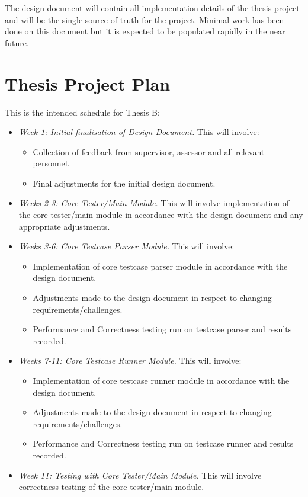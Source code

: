 \documentclass[hidelinks, 12pt]{extreport}
\begin{document}
The design document will contain all implementation details of the thesis project and will be the single source of truth for the project. Minimal work has been done on this document but it is expected to be populated rapidly in the near future.

\section{Thesis Project Plan}

This is the intended schedule for Thesis B:
\begin{itemize}
	\item \textit{Week 1: Initial finalisation of Design Document.} This will involve:
	\begin{itemize}
		\item Collection of feedback from supervisor, assessor and all relevant personnel.
		\item Final adjustments for the initial design document.
	\end{itemize}
	\item \textit{Weeks 2-3: Core Tester/Main Module.} This will involve implementation of the core tester/main module in accordance with the design document and any appropriate adjustments.
	\item \textit{Weeks 3-6: Core Testcase Parser Module.} This will involve:
	\begin{itemize}
		\item Implementation of core testcase parser module in accordance with the design document.
		\item Adjustments made to the design document in respect to changing requirements/challenges.
		\item Performance and Correctness testing run on testcase parser and results recorded.
	\end{itemize}
	\item \textit{Weeks 7-11: Core Testcase Runner Module.} This will involve:
	\begin{itemize}
		\item Implementation of core testcase runner module in accordance with the design document.
		\item Adjustments made to the design document in respect to changing requirements/challenges.
		\item Performance and Correctness testing run on testcase runner and results recorded.
	\end{itemize}
	\item \textit{Week 11: Testing with Core Tester/Main Module.} This will involve correctness testing of the core tester/main module.
\end{itemize}
\end{document}
